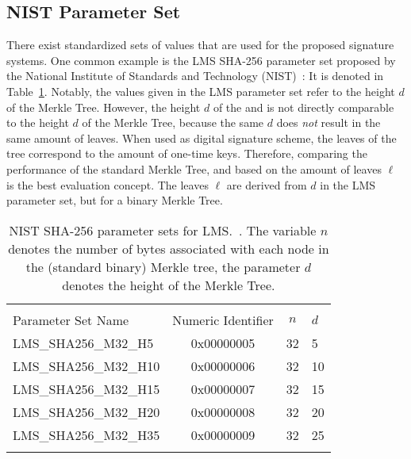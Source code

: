\subsection{NIST Parameter Set}
There exist standardized sets of values that are used for the proposed signature systems. One common example is the LMS SHA-256 parameter set proposed by the National Institute of Standards and Technology (NIST)~\cite{stateful_hashbased_sign_schemes_NIST_2020}: It is denoted in Table~\ref{table:nist_param_lms}. 
Notably, the values given in the LMS parameter set refer to the height $d$ of the Merkle Tree. However, the height $d$ of the \tftree and \extree is not directly comparable to the height $d$ of the Merkle Tree, because the same $d$ does \textit{not} result in the same amount of leaves. When used as digital signature scheme, the leaves of the tree correspond to the amount of one-time keys. Therefore, comparing the performance of the standard Merkle Tree, \tftree and \extree based on the amount of leaves $\ell$ is the best evaluation concept. 
The leaves $\ell$ are derived from $d$ in the LMS parameter set, but for a binary Merkle Tree.


\begin{table}
\centering
\begin{tabular}{l c c l} 
 \hline\noalign{\smallskip}
 \multicolumn{4}{c}{\textbf{LMS Parameter Sets: NIST}} \\
 Parameter Set Name & Numeric Identifier & $n$ & $d$\\
 \hline\noalign{\smallskip}
 LMS\_SHA256\_M32\_H5 & 0x00000005  & 32 & 5 \\
 LMS\_SHA256\_M32\_H10 & 0x00000006  & 32 & 10 \\
 LMS\_SHA256\_M32\_H15 & 0x00000007  & 32 & 15 \\
 LMS\_SHA256\_M32\_H20 & 0x00000008  & 32 & 20 \\
 LMS\_SHA256\_M32\_H35 & 0x00000009  & 32 & 25 \\
 \hline\noalign{\smallskip}
 \end{tabular}
\caption{NIST SHA-256 parameter sets for LMS.~\cite{stateful_hashbased_sign_schemes_NIST_2020}. The variable $n$ denotes the number of bytes associated with each node in the (standard binary) Merkle tree, the parameter $d$ denotes the height of the Merkle Tree.}
\label{table:nist_param_lms}
\end{table}

